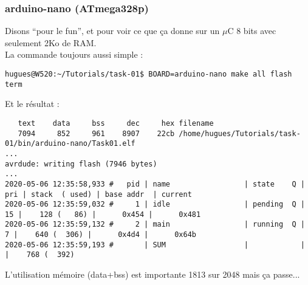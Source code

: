 \subsubsection{arduino-nano (ATmega328p)}

Disons \enquote{pour le fun}, et pour voir ce que ça donne sur un $\mu$C
8 bits avec seulement 2Ko de RAM.\\

La commande toujours aussi simple :
{\scriptsize
\begin{verbatim}
hugues@W520:~/Tutorials/task-01$ BOARD=arduino-nano make all flash term
\end{verbatim}
}
Et le résultat :
{\scriptsize
\begin{verbatim}
   text	   data	    bss	    dec	    hex	filename
   7094	    852	    961	   8907	   22cb	/home/hugues/Tutorials/task-01/bin/arduino-nano/Task01.elf
...
avrdude: writing flash (7946 bytes)
...
2020-05-06 12:35:58,933 # 	pid | name                 | state    Q | pri | stack  ( used) | base addr  | current     
2020-05-06 12:35:59,032 # 	  1 | idle                 | pending  Q |  15 |    128 (   86) |      0x454 |      0x481 
2020-05-06 12:35:59,132 # 	  2 | main                 | running  Q |   7 |    640 (  306) |      0x4d4 |      0x64b 
2020-05-06 12:35:59,193 # 	    | SUM                  |            |     |    768 (  392)
\end{verbatim}
}
L'utilisation mémoire (data+bss) est importante 1813 sur 2048 mais ça
passe...
